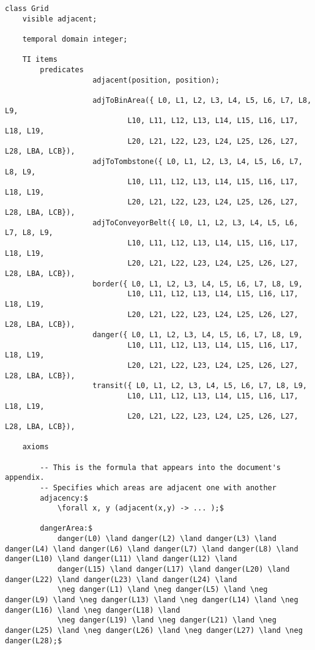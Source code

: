 \begin{lstlisting}[fontadjust, mathescape, frame=single] 
class Grid
    visible adjacent;

    temporal domain integer;

    TI items
        predicates 
                    adjacent(position, position);
                    
                    adjToBinArea({ L0, L1, L2, L3, L4, L5, L6, L7, L8, L9,
                            L10, L11, L12, L13, L14, L15, L16, L17, L18, L19,
                            L20, L21, L22, L23, L24, L25, L26, L27, L28, LBA, LCB}),
                    adjToTombstone({ L0, L1, L2, L3, L4, L5, L6, L7, L8, L9,
                            L10, L11, L12, L13, L14, L15, L16, L17, L18, L19,
                            L20, L21, L22, L23, L24, L25, L26, L27, L28, LBA, LCB}),
                    adjToConveyorBelt({ L0, L1, L2, L3, L4, L5, L6, L7, L8, L9,
                            L10, L11, L12, L13, L14, L15, L16, L17, L18, L19,
                            L20, L21, L22, L23, L24, L25, L26, L27, L28, LBA, LCB}),
                    border({ L0, L1, L2, L3, L4, L5, L6, L7, L8, L9,
                            L10, L11, L12, L13, L14, L15, L16, L17, L18, L19,
                            L20, L21, L22, L23, L24, L25, L26, L27, L28, LBA, LCB}),
                    danger({ L0, L1, L2, L3, L4, L5, L6, L7, L8, L9,
                            L10, L11, L12, L13, L14, L15, L16, L17, L18, L19,
                            L20, L21, L22, L23, L24, L25, L26, L27, L28, LBA, LCB}),
                    transit({ L0, L1, L2, L3, L4, L5, L6, L7, L8, L9,
                            L10, L11, L12, L13, L14, L15, L16, L17, L18, L19,
                            L20, L21, L22, L23, L24, L25, L26, L27, L28, LBA, LCB}),

    axioms
        
        -- This is the formula that appears into the document's appendix.
        -- Specifies which areas are adjacent one with another
        adjacency:$ 
            \forall x, y (adjacent(x,y) -> ... );$

        dangerArea:$
            danger(L0) \land danger(L2) \land danger(L3) \land danger(L4) \land danger(L6) \land danger(L7) \land danger(L8) \land danger(L10) \land danger(L11) \land danger(L12) \land 
            danger(L15) \land danger(L17) \land danger(L20) \land danger(L22) \land danger(L23) \land danger(L24) \land 
            \neg danger(L1) \land \neg danger(L5) \land \neg danger(L9) \land \neg danger(L13) \land \neg danger(L14) \land \neg danger(L16) \land \neg danger(L18) \land
            \neg danger(L19) \land \neg danger(L21) \land \neg danger(L25) \land \neg danger(L26) \land \neg danger(L27) \land \neg danger(L28);$
        

\end{lstlisting}
